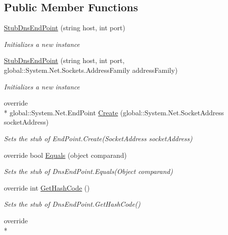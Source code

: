 \subsection*{Public Member Functions}
\begin{DoxyCompactItemize}
\item 
\hyperlink{class_system_1_1_net_1_1_fakes_1_1_stub_dns_end_point_aec73e7308b0c09ef73325d1a13b9efa7}{Stub\-Dns\-End\-Point} (string host, int port)
\begin{DoxyCompactList}\small\item\em Initializes a new instance\end{DoxyCompactList}\item 
\hyperlink{class_system_1_1_net_1_1_fakes_1_1_stub_dns_end_point_ae19ff0745f915fbe3359b744a9d8468d}{Stub\-Dns\-End\-Point} (string host, int port, global\-::\-System.\-Net.\-Sockets.\-Address\-Family address\-Family)
\begin{DoxyCompactList}\small\item\em Initializes a new instance\end{DoxyCompactList}\item 
override \\*
global\-::\-System.\-Net.\-End\-Point \hyperlink{class_system_1_1_net_1_1_fakes_1_1_stub_dns_end_point_a3bf9640253ad4cfa0896a790e45bc7a4}{Create} (global\-::\-System.\-Net.\-Socket\-Address socket\-Address)
\begin{DoxyCompactList}\small\item\em Sets the stub of End\-Point.\-Create(\-Socket\-Address socket\-Address)\end{DoxyCompactList}\item 
override bool \hyperlink{class_system_1_1_net_1_1_fakes_1_1_stub_dns_end_point_a52756424b7fe1f86fb76ae664c3c152a}{Equals} (object comparand)
\begin{DoxyCompactList}\small\item\em Sets the stub of Dns\-End\-Point.\-Equals(\-Object comparand)\end{DoxyCompactList}\item 
override int \hyperlink{class_system_1_1_net_1_1_fakes_1_1_stub_dns_end_point_aabbb77b35147a2c839b9140058df3287}{Get\-Hash\-Code} ()
\begin{DoxyCompactList}\small\item\em Sets the stub of Dns\-End\-Point.\-Get\-Hash\-Code()\end{DoxyCompactList}\item 
override \\*

\end{DoxyCompactItemize}
